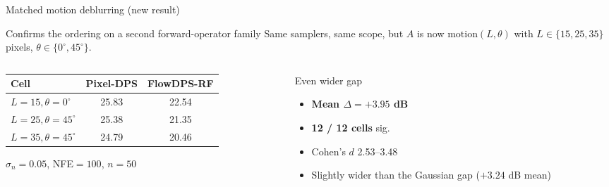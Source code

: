 \documentclass[10pt,aspectratio=169]{beamer}
\begin{document}
\begin{frame}{Matched motion deblurring (new result)}
  \begin{block}{Confirms the ordering on a second forward-operator family}
    Same samplers, same scope, but $A$ is now $\text{motion}(L, \theta)$
    with $L \in \{15, 25, 35\}$ pixels, $\theta \in \{0^\circ, 45^\circ\}$.
  \end{block}

  \vspace{0.5em}
  \begin{columns}
    \begin{column}{0.55\linewidth}
      \begin{table}
        \small
        \begin{tabular}{lcc}
          \toprule
          Cell & Pixel-DPS & FlowDPS-RF \\
          \midrule
          $L{=}15, \theta{=}0^\circ$  & 25.83 & 22.54 \\
          $L{=}25, \theta{=}45^\circ$ & 25.38 & 21.35 \\
          $L{=}35, \theta{=}45^\circ$ & 24.79 & 20.46 \\
          \bottomrule
        \end{tabular}
      \end{table}
      \footnotesize $\sigma_n{=}0.05$, NFE${=}100$, $n{=}50$
    \end{column}
    \begin{column}{0.42\linewidth}
      \begin{block}{Even wider gap}
        \begin{itemize}
          \item \textbf{Mean $\Delta = +3.95$ dB}
          \item \textbf{12 / 12 cells} sig.
          \item Cohen's $d$ 2.53--3.48
          \item Slightly wider than the Gaussian gap ($+3.24$ dB mean)
        \end{itemize}
      \end{block}
    \end{column}
  \end{columns}

\end{frame}
\end{document}
